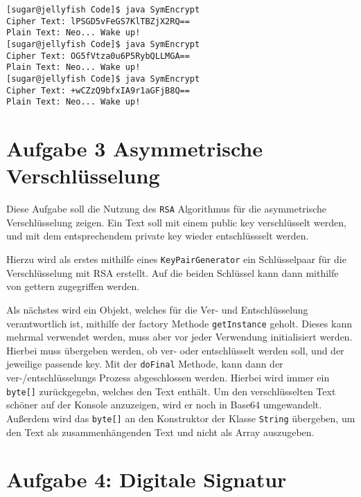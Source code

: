 \documentclass[12pt]{article}
\begin{document}
\begin{lstlisting}
[sugar@jellyfish Code]$ java SymEncrypt 
Cipher Text: lPSGD5vFeGS7KlTBZjX2RQ==
Plain Text: Neo... Wake up!
[sugar@jellyfish Code]$ java SymEncrypt 
Cipher Text: OG5fVtza0u6P5RybQLLMGA==
Plain Text: Neo... Wake up!
[sugar@jellyfish Code]$ java SymEncrypt 
Cipher Text: +wCZzQ9bfxIA9r1aGFjB8Q==
Plain Text: Neo... Wake up!
\end{lstlisting}


\section{Aufgabe 3 Asymmetrische Verschlüsselung}
Diese Aufgabe soll die Nutzung des \texttt{RSA} Algorithmus für die asymmetrische Verschlüsselung zeigen. Ein Text soll mit einem public key verschlüsselt werden, und mit dem entsprechendem private key wieder entschlüssselt werden.

Hierzu wird als erstes mithilfe eines \texttt{KeyPairGenerator} ein Schlüsselpaar für die Verschlüsselung mit RSA erstellt. Auf die beiden Schlüssel kann dann mithilfe von gettern zugegriffen werden.

Als nächstes wird ein Objekt, welches für die Ver- und Entschlüsselung verantwortlich ist, mithilfe der factory Methode \texttt{getInstance} geholt. Dieses kann mehrmal verwendet werden, muss aber vor jeder Verwendung initialisiert werden. Hierbei muss übergeben werden, ob ver- oder entschlüsselt werden soll, und der jeweilige passende key. 
Mit der \texttt{doFinal} Methode, kann dann der ver-/entschlüsselungs Prozess abgeschlossen werden. Hierbei wird immer ein \texttt{byte[]} zurückgegebn, welches den Text enthält. 
Um den verschlüsselten Text schöner auf der Konsole anzuzeigen, wird er noch in Base64 umgewandelt. Außerdem wird das \texttt{byte[]} an den Konstruktor der Klasse \texttt{String} übergeben, um den Text als zusammenhängenden Text und nicht als Array auszugeben.

\section{Aufgabe 4: Digitale Signatur}
\end{document}

